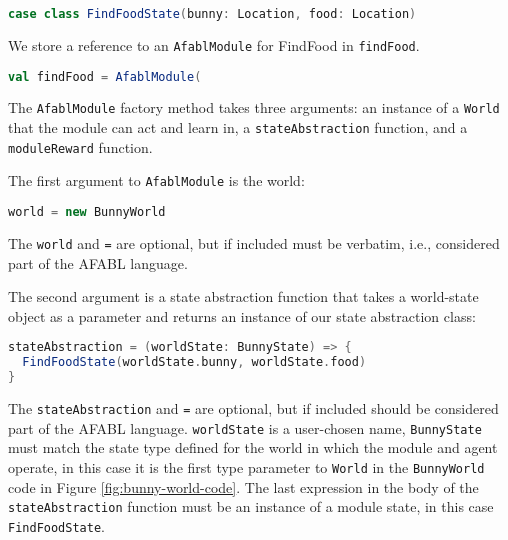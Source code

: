 \begin{center}
\begin{lstlisting}[language=Scala,frame=none]
case class FindFoodState(bunny: Location, food: Location)
\end{lstlisting}
\end{center}

We store a reference to an {\tt AfablModule} for FindFood in {\tt findFood}.

\begin{center}
\begin{lstlisting}[language=Scala,frame=none]
val findFood = AfablModule(
\end{lstlisting}
\end{center}

The {\tt AfablModule} factory method takes three arguments: an instance of a {\tt World} that the module can act and learn in, a {\tt stateAbstraction} function, and a {\tt moduleReward} function.

The first argument to {\tt AfablModule} is the world:

\begin{center}
\begin{lstlisting}[language=Scala,frame=none]
world = new BunnyWorld
\end{lstlisting}
\end{center}

The {\tt world} and {\tt =} are optional, but if included must be verbatim, i.e., considered part of the AFABL language.

The second argument is a state abstraction function that takes a world-state object as a parameter and returns an instance of our state abstraction class:

\begin{center}
\begin{lstlisting}[language=Scala,frame=none]
stateAbstraction = (worldState: BunnyState) => {
  FindFoodState(worldState.bunny, worldState.food)
}
\end{lstlisting}
\end{center}

The {\tt stateAbstraction} and {\tt =} are optional, but if included should be considered part of the AFABL language. {\tt worldState} is a user-chosen name, {\tt BunnyState} must match the state type defined for the world in which the module and agent operate, in this case it is the first type parameter to {\tt World} in the {\tt BunnyWorld} code in Figure \ref{fig:bunny-world-code}. The last expression in the body of the {\tt stateAbstraction} function must be an instance of a module state, in this case {\tt FindFoodState}.

